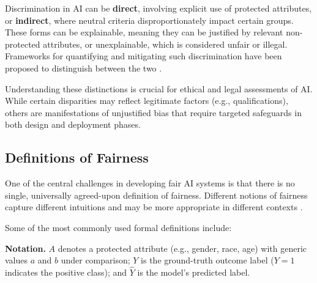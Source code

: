 \documentclass[12pt,a4paper,openright,twoside]{book}
\begin{document}
Discrimination in AI can be \textbf{direct}, involving explicit use of protected attributes, or \textbf{indirect}, where neutral criteria disproportionately impact certain groups. These forms can be explainable, meaning they can be justified by relevant non-protected attributes, or unexplainable, which is considered unfair or illegal. Frameworks for quantifying and mitigating such discrimination have been proposed to distinguish between the two \cite{kamiran2013quantifying,corbett2023measure}.

Understanding these distinctions is crucial for ethical and legal assessments of AI. While certain disparities may reflect legitimate factors (e.g., qualifications), others are manifestations of unjustified bias that require targeted safeguards in both design and deployment phases.

\subsection{Definitions of Fairness}
One of the central challenges in developing fair AI systems is that there is no single, universally agreed-upon definition of fairness. Different notions of fairness capture different intuitions and may be more appropriate in different contexts \cite{verma2018fairness} \cite{mitchell2021algorithmic}.

Some of the most commonly used formal definitions include:

\noindent\textbf{Notation.}  
$A$ denotes a protected attribute (e.g., gender, race, age) with generic values $a$ and $b$ under comparison;  
$Y$ is the ground-truth outcome label ($Y=1$ indicates the positive class); and  
$\hat{Y}$ is the model’s predicted label.
\end{document}
